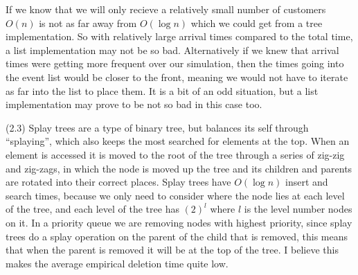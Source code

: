\documentclass{article}
\begin{document}
If we know that we will only recieve a relatively small number of customers $O(n)$ is not as far away from $O(\log n)$ which we could get from a tree implementation. So with relatively large arrival times compared to the total time, a list implementation may not be so bad. Alternatively if we knew that arrival times were getting more frequent over our simulation, then the times going into the event list would be closer to the front, meaning we would not have to iterate as far into the list to place them. It is a bit of an odd situation, but a list implementation may prove to be not so bad in this case too.

\vspace{3mm}

(2.3) Splay trees are a type of binary tree, but balances its self through ``splaying'', which also keeps the most searched for elements at the top. When an element is accessed it is moved to the root of the tree through a series of zig-zig and zig-zags, in which the node is moved up the tree and its children and parents are rotated into their correct places. Splay trees have $O(\log n)$ insert and search times, because we only need to consider where the node lies at each level of the tree, and each level of the tree has $(2)^l$ where $l$ is the level number nodes on it. In a priority queue we are removing nodes with highest priority, since splay trees do a splay operation on the parent of the child that is removed, this means that when the parent is removed it will be at the top of the tree. I believe this makes the average empirical deletion time quite low.
\end{document}
